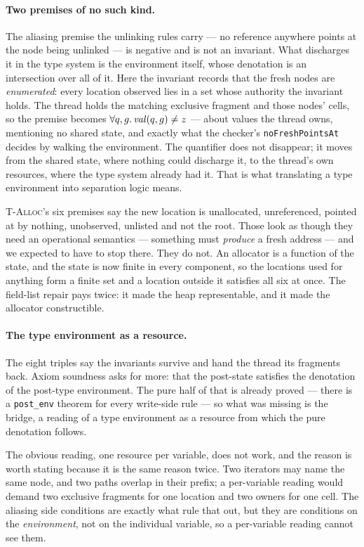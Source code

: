 \paragraph{Two premises of no such kind.}
The aliasing premise the unlinking rules carry --- no \frsh{} reference anywhere
points at the node being unlinked --- is negative and is not an invariant.  What
discharges it in the type system is the environment itself, whose denotation is
an intersection over all of it.  Here the invariant records that the fresh nodes
are \emph{enumerated}: every location observed \frsh{} lies in a set whose
authority the invariant holds.  The thread holds the matching exclusive fragment
and those nodes' cells, so the premise becomes
$\forall q,g \ldotp \mathit{val}(q,g) \neq z$ --- about values the thread owns,
mentioning no shared state, and exactly what the checker's
\texttt{noFreshPointsAt} decides by walking the environment.  The quantifier
does not disappear; it moves from the shared state, where nothing could
discharge it, to the thread's own resources, where the type system already had
it.  That is what translating a type environment into separation logic means.

\textsc{T-Alloc}'s six premises say the new location is unallocated,
unreferenced, pointed at by nothing, unobserved, unlisted and not the root.
Those look as though they need an operational semantics --- something must
\emph{produce} a fresh address --- and we expected to have to stop there.  They
do not.  An allocator is a function of the state, and the state is now finite in
every component, so the locations used for anything form a finite set and a
location outside it satisfies all six at once.  The field-list repair pays
twice: it made the heap representable, and it made the allocator constructible.

\paragraph{The type environment as a resource.}
The eight triples say the invariants survive and hand the thread its fragments
back.  Axiom soundness asks for more: that the post-state satisfies the
denotation of the post-type environment.  The pure half of that is already
proved --- there is a \texttt{post\_env} theorem for every write-side rule ---
so what was missing is the bridge, a reading of a type environment as a resource
from which the pure denotation follows.

The obvious reading, one resource per variable, does not work, and the reason is
worth stating because it is the same reason twice.  Two iterators may name the
same node, and two paths overlap in their prefix; a per-variable reading would
demand two exclusive fragments for one location and two owners for one cell.
The aliasing side conditions are exactly what rule that out, but they are
conditions on the \emph{environment}, not on the individual variable, so a
per-variable reading cannot see them.

